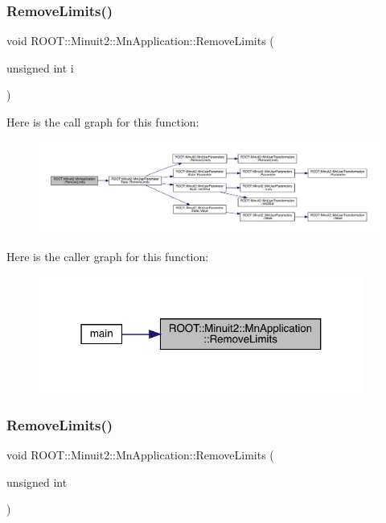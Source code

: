 \subsubsection{\texorpdfstring{RemoveLimits()}{RemoveLimits()}\hspace{0.1cm}{\footnotesize\ttfamily [1/4]}}
{\footnotesize\ttfamily void R\+O\+O\+T\+::\+Minuit2\+::\+Mn\+Application\+::\+Remove\+Limits (\begin{DoxyParamCaption}\item[{unsigned int}]{i }\end{DoxyParamCaption})}

Here is the call graph for this function\+:\nopagebreak
\begin{figure}[H]
\begin{center}
\leavevmode
\includegraphics[width=350pt]{df/dd5/classROOT_1_1Minuit2_1_1MnApplication_a2c99043d2263ae51967867e1a26d4e30_cgraph}
\end{center}
\end{figure}
Here is the caller graph for this function\+:\nopagebreak
\begin{figure}[H]
\begin{center}
\leavevmode
\includegraphics[width=304pt]{df/dd5/classROOT_1_1Minuit2_1_1MnApplication_a2c99043d2263ae51967867e1a26d4e30_icgraph}
\end{center}
\end{figure}
\mbox{\label{classROOT_1_1Minuit2_1_1MnApplication_a2c99043d2263ae51967867e1a26d4e30}} 
\subsubsection{\texorpdfstring{RemoveLimits()}{RemoveLimits()}\hspace{0.1cm}{\footnotesize\ttfamily [2/4]}}
{\footnotesize\ttfamily void R\+O\+O\+T\+::\+Minuit2\+::\+Mn\+Application\+::\+Remove\+Limits (\begin{DoxyParamCaption}\item[{unsigned int}]{ }\end{DoxyParamCaption})}

